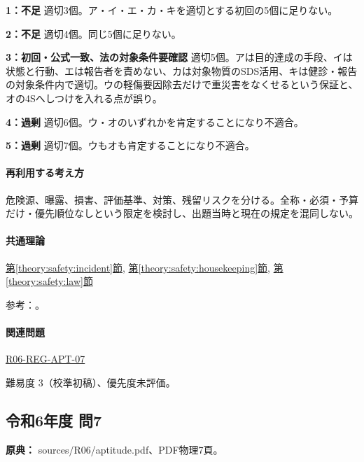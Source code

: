 \noindent\textbf{1：不足} 適切3個。ア・イ・エ・カ・キを適切とする初回の5個に足りない。\par

\noindent\textbf{2：不足} 適切4個。同じ5個に足りない。\par

\noindent\textbf{3：初回・公式一致、法の対象条件要確認} 適切5個。アは目的達成の手段、イは状態と行動、エは報告者を責めない、カは対象物質のSDS活用、キは健診・報告の対象条件内で適切。ウの軽傷要因除去だけで重災害をなくせるという保証と、オの4Sへしつけを入れる点が誤り。\par

\noindent\textbf{4：過剰} 適切6個。ウ・オのいずれかを肯定することになり不適合。\par

\noindent\textbf{5：過剰} 適切7個。ウもオも肯定することになり不適合。\par

\paragraph{再利用する考え方} 危険源、曝露、損害、評価基準、対策、残留リスクを分ける。全称・必須・予算だけ・優先順位なしという限定を検討し、出題当時と現在の規定を混同しない。

\paragraph{共通理論} \hyperref[theory:safety:incident]{第\ref*{theory:safety:incident}節}, \hyperref[theory:safety:housekeeping]{第\ref*{theory:safety:housekeeping}節}, \hyperref[theory:safety:law]{第\ref*{theory:safety:law}節}

\par 参考：\cite{saf_welfare,saf_4s,saf_chemqa,saf_healthreport}。

\paragraph{関連問題} \hyperref[q:r06-reg-apt-07]{R06-REG-APT-07}

\par 難易度 3（校準初稿）、優先度未評価。

\subsection{令和6年度 問7}
\label{q:r06-reg-apt-07}

\noindent\textbf{原典：} sources/R06/aptitude.pdf、PDF物理7頁。

